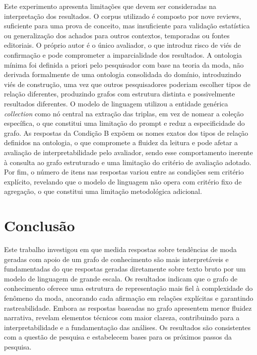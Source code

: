 \documentclass[sigconf]{acmart}
\begin{document}
Este experimento apresenta limitações que devem ser consideradas na interpretação dos resultados. O corpus utilizado é composto por nove reviews, suficiente para uma prova de conceito, mas insuficiente para validação estatística ou generalização dos achados para outros contextos, temporadas ou fontes editoriais. O próprio autor é o único avaliador, o que introduz risco de viés de confirmação e pode comprometer a imparcialidade dos resultados. A ontologia mínima foi definida a priori pelo pesquisador com base na teoria da moda, não derivada formalmente de uma ontologia consolidada do domínio, introduzindo viés de construção, uma vez que outros pesquisadores poderiam escolher tipos de relação diferentes, produzindo grafos com estrutura distinta e possivelmente resultados diferentes. O modelo de linguagem utilizou a entidade genérica \textit{collection} como nó central na extração das triplas, em vez de nomear a coleção específica, o que constitui uma limitação do prompt e reduz a especificidade do grafo. As respostas da Condição B expõem os nomes exatos dos tipos de relação definidos na ontologia, o que compromete a fluidez da leitura e pode afetar a avaliação de interpretabilidade pelo avaliador, sendo esse comportamento inerente à consulta ao grafo estruturado e uma limitação do critério de avaliação adotado. Por fim, o número de itens nas respostas variou entre as condições sem critério explícito, revelando que o modelo de linguagem não opera com critério fixo de agregação, o que constitui uma limitação metodológica adicional.

\section{Conclusão}
\label{sec:conclusao}

Este trabalho investigou em que medida respostas sobre tendências de moda geradas com apoio de um grafo de conhecimento são mais interpretáveis e fundamentadas do que respostas geradas diretamente sobre texto bruto por um modelo de linguagem de grande escala. Os resultados indicam que o grafo de conhecimento oferece uma estrutura de representação mais fiel à complexidade do fenômeno da moda, ancorando cada afirmação em relações explícitas e garantindo rastreabilidade. Embora as respostas baseadas no grafo apresentem menor fluidez narrativa, revelam elementos técnicos com maior clareza, contribuindo para a interpretabilidade e a fundamentação das análises. Os resultados são consistentes com a questão de pesquisa e estabelecem bases para os próximos passos da pesquisa.
\end{document}
